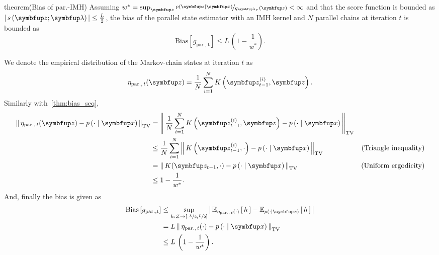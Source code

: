 
\begin{theoremEnd}{theorem}(Bias of par.-IMH)
  Assuming \(w^* = \sup_{\vz} \nicefrac{p\left(\vz\mid\vx\right)}{q_{\vlambda_{\tau}}\left(\vz\right)} < \infty\) and that the score function is bounded as \(\left|\, s\left(\vz; \vlambda\right) \,\right| \leq \frac{L}{2}\), the bias of the parallel state estimator with an IMH kernel and \(N\) parallel chains at iteration \(t\) is bounded as
  {\small
\[
    \mathrm{Bias}\left[ g_{\mathrm{par.,\, t}} \right] \leq L\, \left(1 - \frac{1}{w^*}\right).
\]
  }
\end{theoremEnd}
\begin{proofEnd}
  We denote the empirical distribution of the Markov-chain states at iteration \(t\) as
  \begin{align}
    \eta_{\mathrm{par.},\, t}(\vz) = \frac{1}{N} \sum_{i=1}^N K\left(\vz_{t-1}^{(i)}, \vz\right).
  \end{align}
  Similarly with~\cref{thm:bias_seq}, 
  \begin{align}
    \DTV{ \eta_{\mathrm{par.},\, t}(\vz) }{p\left(\cdot\mid\vx\right)}
    &= \DTV{\frac{1}{N} \sum_{i=1}^N K\left(\vz_{t-1}^{(i)}, \vz\right)}{p\left(\cdot\mid\vx\right)} \\
    &\leq \frac{1}{N} \sum_{i=1}^N  \DTV{K\left(\vz_{t-1}^{(i)}, \cdot\right)}{p\left(\cdot\mid\vx\right)} &\text{(Triangle inequality)} \\
    &=    \DTV{K(\vz_{t-1}, \cdot)}{p\left(\cdot\mid\vx\right)} &\text{(Uniform ergodicity)} \\
    &\leq 1 - \frac{1}{w^*}.
  \end{align}
  And, finally the bias is given as
 \begin{align}
   \mathrm{Bias}\left[ g_{\mathrm{par., t}} \right]
   &\leq \sup_{h : \mathcal{Z} \rightarrow \left[ \text{-}\nicefrac{L}{2}, \nicefrac{L}{2} \right]} \left|\, \Esub{\eta_{\mathrm{par.},\, t}(\cdot)}{h} - \Esub{p(\cdot\mid\vx)}{h} \,\right| \\
   &= L\, \DTV{ \eta_{\mathrm{par.},\, t}(\cdot) }{p\left(\cdot\mid\vx\right)}  \\
   &\leq L \, \left(1 - \frac{1}{w^*}\right).
 \end{align}
\end{proofEnd}

